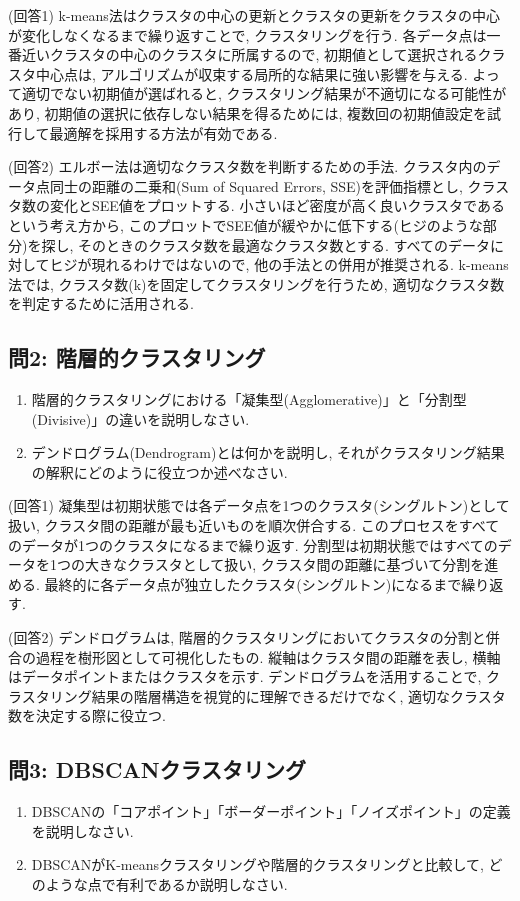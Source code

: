 \documentclass[dvipdfmx, 10pt]{jsarticle}
\begin{document}
(回答1)
k-means法はクラスタの中心の更新とクラスタの更新をクラスタの中心が変化しなくなるまで繰り返すことで, クラスタリングを行う. 
各データ点は一番近いクラスタの中心のクラスタに所属するので, 
初期値として選択されるクラスタ中心点は, アルゴリズムが収束する局所的な結果に強い影響を与える. 
よって適切でない初期値が選ばれると, クラスタリング結果が不適切になる可能性があり, 
初期値の選択に依存しない結果を得るためには, 複数回の初期値設定を試行して最適解を採用する方法が有効である.   

(回答2)
エルボー法は適切なクラスタ数を判断するための手法. 
クラスタ内のデータ点同士の距離の二乗和(Sum of Squared Errors, SSE)を評価指標とし, クラスタ数の変化とSEE値をプロットする. 
小さいほど密度が高く良いクラスタであるという考え方から, このプロットでSEE値が緩やかに低下する(ヒジのような部分)を探し, 
そのときのクラスタ数を最適なクラスタ数とする. すべてのデータに対してヒジが現れるわけではないので, 他の手法との併用が推奨される. 
k-means法では, クラスタ数(k)を固定してクラスタリングを行うため, 適切なクラスタ数を判定するために活用される. 

\subsection*{問2: 階層的クラスタリング}
\begin{enumerate}
    \item 階層的クラスタリングにおける「凝集型(Agglomerative)」と「分割型(Divisive)」の違いを説明しなさい. 
    \item デンドログラム(Dendrogram)とは何かを説明し, それがクラスタリング結果の解釈にどのように役立つか述べなさい. 
\end{enumerate}

(回答1)
凝集型は初期状態では各データ点を1つのクラスタ(シングルトン)として扱い, 
クラスタ間の距離が最も近いものを順次併合する. このプロセスをすべてのデータが1つのクラスタになるまで繰り返す. 
分割型は初期状態ではすべてのデータを1つの大きなクラスタとして扱い, 
クラスタ間の距離に基づいて分割を進める. 最終的に各データ点が独立したクラスタ(シングルトン)になるまで繰り返す. 

(回答2)
デンドログラムは, 階層的クラスタリングにおいてクラスタの分割と併合の過程を樹形図として可視化したもの. 
縦軸はクラスタ間の距離を表し, 横軸はデータポイントまたはクラスタを示す. デンドログラムを活用することで, 
クラスタリング結果の階層構造を視覚的に理解できるだけでなく, 適切なクラスタ数を決定する際に役立つ. 

\subsection*{問3: DBSCANクラスタリング}
\begin{enumerate}
    \item DBSCANの「コアポイント」「ボーダーポイント」「ノイズポイント」の定義を説明しなさい. 
    \item DBSCANがK-meansクラスタリングや階層的クラスタリングと比較して, どのような点で有利であるか説明しなさい. 
\end{enumerate}
\end{document}
